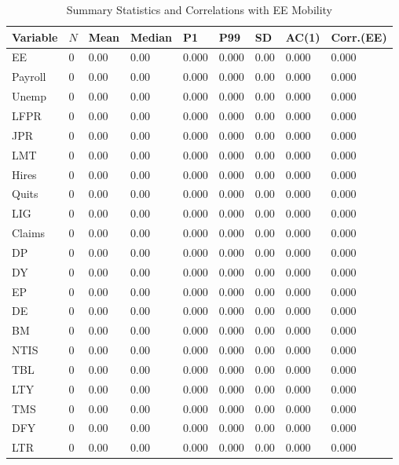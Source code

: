\begin{table}[H]
\caption{Summary Statistics and Correlations with EE Mobility}\label{tab:A_summary}
\fontsize{10}{12}\selectfont\noindent
\begin{tabular}{@{}L{89pt}C{35pt}C{45pt}C{45pt}C{52pt}C{52pt}C{45pt}C{50pt}C{55pt}@{}}
\toprule
Variable & $N$ & Mean & Median & P1 & P99 & SD & AC(1) & Corr.\newline(EE)\\
\midrule
EE & 0 & 0.00 & 0.00 & 0.000 & 0.000 & 0.00 & 0.000 & 0.000\\
Payroll & 0 & 0.00 & 0.00 & 0.000 & 0.000 & 0.00 & 0.000 & 0.000\\
Unemp & 0 & 0.00 & 0.00 & 0.000 & 0.000 & 0.00 & 0.000 & 0.000\\
LFPR & 0 & 0.00 & 0.00 & 0.000 & 0.000 & 0.00 & 0.000 & 0.000\\
JPR & 0 & 0.00 & 0.00 & 0.000 & 0.000 & 0.00 & 0.000 & 0.000\\
LMT & 0 & 0.00 & 0.00 & 0.000 & 0.000 & 0.00 & 0.000 & 0.000\\
Hires & 0 & 0.00 & 0.00 & 0.000 & 0.000 & 0.00 & 0.000 & 0.000\\
Quits & 0 & 0.00 & 0.00 & 0.000 & 0.000 & 0.00 & 0.000 & 0.000\\
LIG & 0 & 0.00 & 0.00 & 0.000 & 0.000 & 0.00 & 0.000 & 0.000\\
Claims & 0 & 0.00 & 0.00 & 0.000 & 0.000 & 0.00 & 0.000 & 0.000\\
DP & 0 & 0.00 & 0.00 & 0.000 & 0.000 & 0.00 & 0.000 & 0.000\\
DY & 0 & 0.00 & 0.00 & 0.000 & 0.000 & 0.00 & 0.000 & 0.000\\
EP & 0 & 0.00 & 0.00 & 0.000 & 0.000 & 0.00 & 0.000 & 0.000\\
DE & 0 & 0.00 & 0.00 & 0.000 & 0.000 & 0.00 & 0.000 & 0.000\\
BM & 0 & 0.00 & 0.00 & 0.000 & 0.000 & 0.00 & 0.000 & 0.000\\
NTIS & 0 & 0.00 & 0.00 & 0.000 & 0.000 & 0.00 & 0.000 & 0.000\\
TBL & 0 & 0.00 & 0.00 & 0.000 & 0.000 & 0.00 & 0.000 & 0.000\\
LTY & 0 & 0.00 & 0.00 & 0.000 & 0.000 & 0.00 & 0.000 & 0.000\\
TMS & 0 & 0.00 & 0.00 & 0.000 & 0.000 & 0.00 & 0.000 & 0.000\\
DFY & 0 & 0.00 & 0.00 & 0.000 & 0.000 & 0.00 & 0.000 & 0.000\\
LTR & 0 & 0.00 & 0.00 & 0.000 & 0.000 & 0.00 & 0.000 & 0.000\\

\end{tabular}
\end{table}
